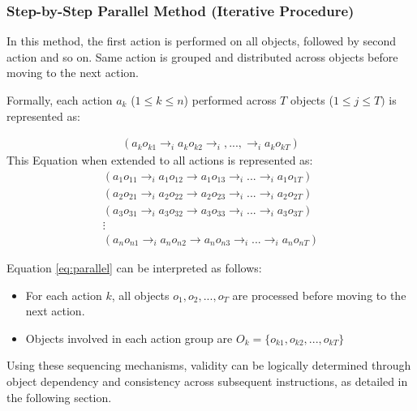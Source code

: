 \documentclass[a4paper,11pt]{lmcs}
\begin{document}
\subsubsection{Step-by-Step Parallel Method (Iterative Procedure)}
In this method, the first action is performed on all objects, followed by second action and so on. Same action is grouped and distributed across objects before moving to the next action.

Formally, each action $a_k$ ($1 \leq k \leq n$) performed across $T$ objects ($1 \leq j \leq T)$ is represented as:

\begin{eqnarray}
 \label{eq:parallel_single}
 (a_ko_{k1} \rightarrow_i a_ko_{k2} \rightarrow_i,...,\rightarrow_i a_ko_{kT})
\end{eqnarray}
This Equation when extended to all actions is represented as:
\begin{eqnarray}
\label{eq:parallel}
(a_{1} o_{11} \rightarrow_i a_1 o_{12} \rightarrow a_1 o_{13} \rightarrow_i ... \rightarrow_i a_1 o_{1T}) \\
(a_{2} o_{21} \rightarrow_i a_2 o_{22} \rightarrow a_2 o_{23} \rightarrow_i ... \rightarrow_i a_2 o_{2T}) \nonumber \\
(a_{3} o_{31} \rightarrow_i a_3 o_{32} \rightarrow a_3 o_{33} \rightarrow_i ... \rightarrow_i a_3 o_{3T}) \nonumber \\
\vdots \nonumber \\
(a_{n} o_{n1} \rightarrow_i a_n o_{n2} \rightarrow a_n o_{n3} \rightarrow_i ... \rightarrow_i a_n o_{nT}) \nonumber
\end{eqnarray}

Equation \ref{eq:parallel} can be interpreted as follows:
\begin{itemize}
 \item For each action $k$, all objects $o_1,o_2,...,o_T$ are processed before moving to the next action.
 \item Objects involved in each action group are $O_k = \{o_{k1},o_{k2},...,o_{kT} \}$
\end{itemize}

Using these sequencing mechanisms, validity can be logically determined through object dependency and consistency across subsequent instructions, as detailed in the following section.
\end{document}
